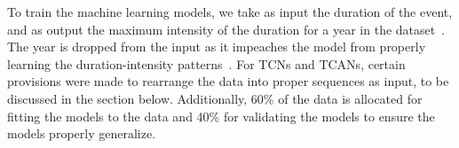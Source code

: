 To train the machine learning models, we take as input the duration of the event, and as output the maximum intensity of the duration for a year in the dataset~\cite{idfkoya}. The year is dropped from the input as it impeaches the model from properly learning the duration-intensity patterns~\cite{idfkoya}. For TCNs and TCANs, certain provisions were made to rearrange the data into proper sequences as input, to be discussed in the section below. Additionally, 60\% of the data is allocated for fitting the models to the data and 40\% for validating the models to ensure the models properly generalize.